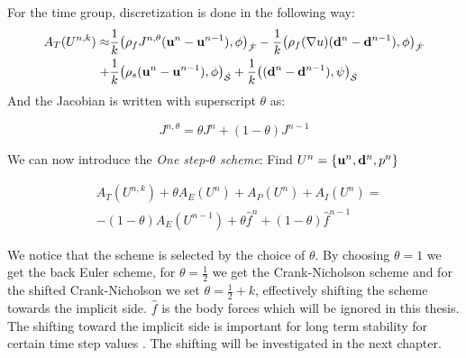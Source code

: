 For the time group, discretization is done in the following way:
\begin{align}
A_T(U^{n,k}) \approx & \frac{1}{k} \big( \rho_f J^{n,\theta} (\bold{u}^n - \bold{u}^{n-1}) , \phi  \big)_{\mathcal{\hat{F}}} - \frac{1}{k} \big( \rho_f (\nabla u ) (\bold{d}^n - \bold{d}^{n-1}) , \phi \big)_{\mathcal{\hat{F}}} \\
+ & \frac{1}{k} \big( \rho_s  (\bold{u}^n - \bold{u}^{n-1}) , \phi  \big)_{\mathcal{\hat{S}}} +  \frac{1}{k} \big( (\bold{d}^n - \bold{d}^{n-1}) , \psi  \big)_{\mathcal{\hat{S}}}
\end{align}
And the Jacobian is written with superscript $\theta$ as:

\begin{equation}
J^{n, \theta} = \theta J^n + (1-\theta)J^{n-1}
\end{equation}

We can now introduce the \textit{One step-$\theta$ scheme}: 
Find $U^n = \{\bold{u}^n , \bold{d}^n, p^n \}$

\begin{align}
& A_T(U^{n,k}) + \theta A_E(U^{n}) + A_P(U^{n}) + A_I(U^{n}) = \\
& - (1-\theta) A_E(U^{n-1}) + \theta \hat{f}^n + (1-\theta) \hat{f}^{n-1}  
\end{align}

We notice that the scheme is selected by the choice of $\theta $. By choosing $ \theta = 1$ we get the back Euler scheme, for $ \theta = \frac{1}{2}$ we get the Crank-Nicholson scheme and for the shifted Crank-Nicholson we set $ \theta = \frac{1}{2} + k$, effectively shifting the scheme towards the implicit side. $\hat{f}$ is the body forces which will be ignored in this thesis. The shifting toward the implicit side is important for long term stability for certain time step values \cite{Wick2011}. The shifting will be investigated in the next chapter.





